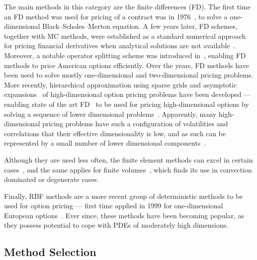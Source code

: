 \documentclass{UUThesisTemplate}
\begin{document}
\par
The main methods in this category are the finite differences (FD). The first time an FD method was used for pricing of a contract was in 1976~\cite{brennan1976pricing}, to solve a one-dimensional Black--Scholes--Merton equation. A few years later, FD schemes, together with MC methods, were established as a standard numerical approach for pricing financial derivatives when analytical solutions are not available~\cite{brennan1978finite}. Moreover, a notable operator splitting scheme was introduced in~\cite{ikonen2004operator}, enabling FD methods to price American options efficiently. Over the years, FD methods have been used to solve mostly one-dimensional and two-dimensional pricing problems. More recently, hierarchical approximation using sparse grids and asymptotic expansions~\cite{reisinger2007efficient, reisinger2015numerical} of high-dimensional option pricing problems have been developed --- enabling state of the art FD~\cite{lotstedt2007space, persson2010pricing, foulon2010adi, haentjens2012adi} to be used for pricing high-dimensional options by solving a sequence of lower dimensional problems~\cite{vonsydow2016pricing}. Apparently, many high-dimensional pricing problems have such a configuration of volatilities and correlations that their effective dimensionality is low, and as such can be represented by a small number of lower dimensional components~\cite{wang2005high}.

\par
Although they are used less often, the finite element methods can excel in certain cases~\cite{zvan1998general, forsyth1999finite, heinecke2012highly}, and the same applies for finite volumes~\cite{zvan2001finite}, which finds its use in convection dominated or degenerate cases.

\par
Finally, RBF methods are a more recent group of deterministic methods to be used for option pricing --- first time applied in 1999 for one-dimensional European options~\cite{hon1999radial}. Ever since, these methods have been becoming popular, as they possess potential to cope with PDEs of moderately high dimensions.
%



%
\subsection{Method Selection}
\end{document}
